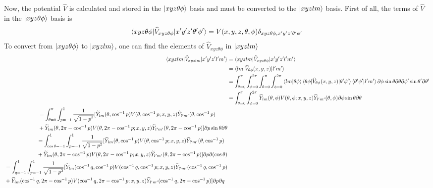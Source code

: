 \documentclass{revtex4-1}
\begin{document}
Now, the potential $\widehat{V}$ is calculated and stored in the $\ket{xyz\theta\phi}$ basis and must be converted to the $\ket{xyzlm}$ basis. First of all, the terms of $\widehat{V}$ in the $\ket{xyz\theta\phi}$ basis is
\begin{equation}
\braket{xyz\theta\phi|\widehat{V}_{xyz\theta\phi}|x'y'z'\theta'\phi'} = V(x,y,z,\theta,\phi)\delta_{xyz\theta\phi,x'y'z'\theta'\phi'}
\end{equation}
To convert from $\ket{xyz\theta\phi}$ to $\ket{xyzlm}$, one can find the elements of $\widehat{V}_{xyz\theta\phi}$ in $\ket{xyzlm}$
\begin{align}
\braket{xyzlm|\widehat{V}_{xyzlm}|x'y'z'l'm'} &= \braket{xyzlm|\widehat{V}_{xyz\theta\phi}|x'y'z'l'm'}\\
											 &= \braket{lm|\widehat{V}_{\theta\phi}(x,y,z)|l'm'}\\
											 &= \int_{\theta=0}^{\pi}\int_{\phi=0}^{2\pi}\int_{\theta=0}^{\pi}\int_{\phi=0}^{2\pi}\braket{lm|\theta\phi}\braket{\theta\phi|\widehat{V}_{\theta\phi}(x,y,z)|\theta'\phi'}\braket{\theta'\phi'|l'm'}\partial\phi \sin \theta \partial\theta \partial\phi' \sin \theta' \partial\theta'\\
											 &= \int_{\theta=0}^{\pi}\int_{\phi=0}^{2\pi}\widetilde{Y}_{lm}(\theta,\phi)V(\theta,\phi; x,y,z)\widetilde{Y}_{l'm'}(\theta,\phi)\partial\phi \sin \theta \partial\theta \\
											 \begin{split} &=\int_{\theta=0}^{\pi}\int_{p=-1}^{1}\frac{1}{\sqrt{1-p^{2}}}\lbrack\widetilde{Y}_{lm}(\theta, \cos^{-1}p)V(\theta, \cos^{-1}p; x,y,z)\widetilde{Y}_{l'm'}(\theta, \cos^{-1}p) \\&+ \widetilde{Y}_{lm}(\theta, 2\pi-\cos^{-1}p)V(\theta, 2\pi-\cos^{-1}p; x,y,z)\widetilde{Y}_{l'm'}(\theta, 2\pi-\cos^{-1}p)\rbrack \partial p \sin \theta \partial\theta \end{split}\\
											 \begin{split} &=\int_{\cos\theta=-1}^{1}\int_{p=-1}^{1}\frac{1}{\sqrt{1-p^{2}}}\lbrack\widetilde{Y}_{lm}(\theta, \cos^{-1}p)V(\theta, \cos^{-1}p; x,y,z)\widetilde{Y}_{l'm'}(\theta, \cos^{-1}p) \\&+ \widetilde{Y}_{lm}(\theta, 2\pi-\cos^{-1}p)V(\theta, 2\pi-\cos^{-1}p; x,y,z)\widetilde{Y}_{l'm'}(\theta, 2\pi-\cos^{-1}p)\rbrack \partial p  \partial (\cos \theta) \end{split}\\
											 \begin{split} &=\int_{q=-1}^{1}\int_{p=-1}^{1}\frac{1}{\sqrt{1-p^{2}}}\lbrack\widetilde{Y}_{lm}(\cos^{-1}q, \cos^{-1}p)V(\cos^{-1}q, \cos^{-1}p; x,y,z)\widetilde{Y}_{l'm'}(\cos^{-1}q, \cos^{-1}p) \\&+ \widetilde{Y}_{lm}(\cos^{-1}q, 2\pi-\cos^{-1}p)V(\cos^{-1}q, 2\pi-\cos^{-1}p; x,y,z)\widetilde{Y}_{l'm'}(\cos^{-1}q, 2\pi-\cos^{-1}p)\rbrack \partial p  \partial q \end{split}\\

\end{align}
\end{document}
